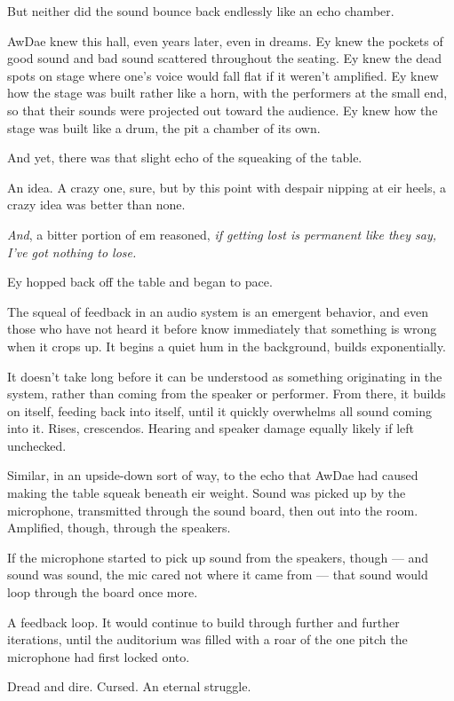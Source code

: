 But neither did the sound bounce back endlessly like an echo chamber.

AwDae knew this hall, even years later, even in dreams. Ey knew the pockets of good sound and bad sound scattered throughout the seating. Ey knew the dead spots on stage where one's voice would fall flat if it weren't amplified. Ey knew how the stage was built rather like a horn, with the performers at the small end, so that their sounds were projected out toward the audience. Ey knew how the stage was built like a drum, the pit a chamber of its own.

And yet, there was that slight echo of the squeaking of the table.

An idea. A crazy one, sure, but by this point with despair nipping at eir heels, a crazy idea was better than none.

\emph{And}, a bitter portion of em reasoned, \emph{if getting lost is permanent like they say, I've got nothing to lose.}

Ey hopped back off the table and began to pace.

The squeal of feedback in an audio system is an emergent behavior, and even those who have not heard it before know immediately that something is wrong when it crops up. It begins a quiet hum in the background, builds exponentially.

It doesn't take long before it can be understood as something originating in the system, rather than coming from the speaker or performer. From there, it builds on itself, feeding back into itself, until it quickly overwhelms all sound coming into it. Rises, crescendos. Hearing and speaker damage equally likely if left unchecked.

Similar, in an upside-down sort of way, to the echo that AwDae had caused making the table squeak beneath eir weight. Sound was picked up by the microphone, transmitted through the sound board, then out into the room. Amplified, though, through the speakers.

If the microphone started to pick up sound from the speakers, though --- and sound was sound, the mic cared not where it came from --- that sound would loop through the board once more.

A feedback loop. It would continue to build through further and further iterations, until the auditorium was filled with a roar of the one pitch the microphone had first locked onto.

Dread and dire. Cursed. An eternal struggle.

